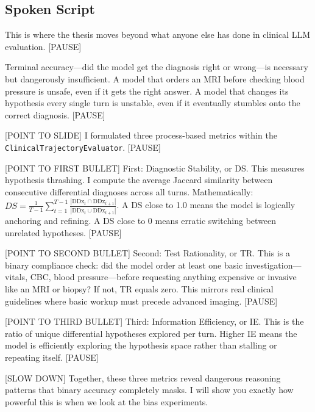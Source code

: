 \subsection*{Spoken Script}
\begin{spokenbox}
 This is where the thesis moves beyond what anyone else has done in clinical LLM evaluation. [PAUSE]

Terminal accuracy---did the model get the diagnosis right or wrong---is necessary but dangerously insufficient. A model that orders an MRI before checking blood pressure is unsafe, even if it gets the right answer. A model that changes its hypothesis every single turn is unstable, even if it eventually stumbles onto the correct diagnosis. [PAUSE]

[POINT TO SLIDE] I formulated three process-based metrics within the \texttt{ClinicalTrajectoryEvaluator}. [PAUSE]

[POINT TO FIRST BULLET] First: Diagnostic Stability, or DS. This measures hypothesis thrashing. I compute the average Jaccard similarity between consecutive differential diagnoses across all turns. Mathematically: $DS = \frac{1}{T-1} \sum_{t=1}^{T-1} \frac{|\text{DDx}_t \cap \text{DDx}_{t+1}|}{|\text{DDx}_t \cup \text{DDx}_{t+1}|}$. A DS close to 1.0 means the model is logically anchoring and refining. A DS close to 0 means erratic switching between unrelated hypotheses. [PAUSE]

[POINT TO SECOND BULLET] Second: Test Rationality, or TR. This is a binary compliance check: did the model order at least one basic investigation---vitals, CBC, blood pressure---before requesting anything expensive or invasive like an MRI or biopsy? If not, TR equals zero. This mirrors real clinical guidelines where basic workup must precede advanced imaging. [PAUSE]

[POINT TO THIRD BULLET] Third: Information Efficiency, or IE. This is the ratio of unique differential hypotheses explored per turn. Higher IE means the model is efficiently exploring the hypothesis space rather than stalling or repeating itself. [PAUSE]

[SLOW DOWN] Together, these three metrics reveal dangerous reasoning patterns that binary accuracy completely masks. I will show you exactly how powerful this is when we look at the bias experiments.
\end{spokenbox}

